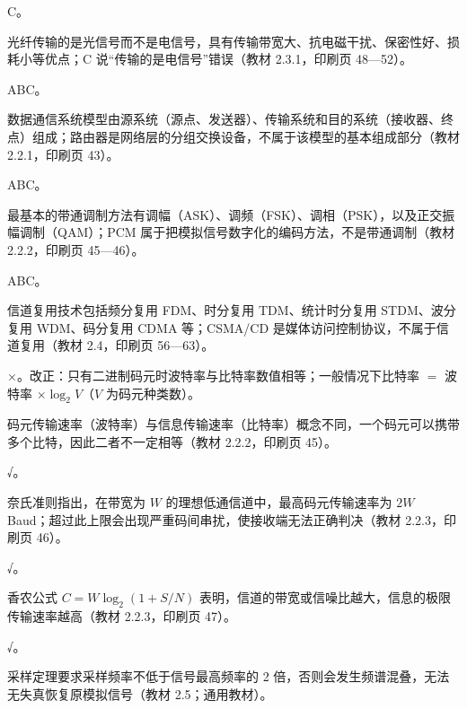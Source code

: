 \documentclass[a4paper,11pt]{article}
\begin{document}
\q C。\begin{analysis}光纤传输的是光信号而不是电信号，具有传输带宽大、抗电磁干扰、保密性好、损耗小等优点；C 说“传输的是电信号”错误（教材 2.3.1，印刷页 48—52）。\end{analysis}


\q ABC。\begin{analysis}数据通信系统模型由源系统（源点、发送器）、传输系统和目的系统（接收器、终点）组成；路由器是网络层的分组交换设备，不属于该模型的基本组成部分（教材 2.2.1，印刷页 43）。\end{analysis}

\q ABC。\begin{analysis}最基本的带通调制方法有调幅（ASK）、调频（FSK）、调相（PSK），以及正交振幅调制（QAM）；PCM 属于把模拟信号数字化的编码方法，不是带通调制（教材 2.2.2，印刷页 45—46）。\end{analysis}

\q ABC。\begin{analysis}信道复用技术包括频分复用 FDM、时分复用 TDM、统计时分复用 STDM、波分复用 WDM、码分复用 CDMA 等；CSMA/CD 是媒体访问控制协议，不属于信道复用（教材 2.4，印刷页 56—63）。\end{analysis}


\q ×。改正：只有二进制码元时波特率与比特率数值相等；一般情况下比特率 $=$ 波特率 $\times\log_2 V$（$V$ 为码元种类数）。\begin{analysis}码元传输速率（波特率）与信息传输速率（比特率）概念不同，一个码元可以携带多个比特，因此二者不一定相等（教材 2.2.2，印刷页 45）。\end{analysis}

\q √。\begin{analysis}奈氏准则指出，在带宽为 $W$ 的理想低通信道中，最高码元传输速率为 $2W$ Baud；超过此上限会出现严重码间串扰，使接收端无法正确判决（教材 2.2.3，印刷页 46）。\end{analysis}

\q √。\begin{analysis}香农公式 $C=W\log_2(1+S/N)$ 表明，信道的带宽或信噪比越大，信息的极限传输速率越高（教材 2.2.3，印刷页 47）。\end{analysis}

\q √。\begin{analysis}采样定理要求采样频率不低于信号最高频率的 2 倍，否则会发生频谱混叠，无法无失真恢复原模拟信号（教材 2.5；通用教材）。\end{analysis}
\end{document}
